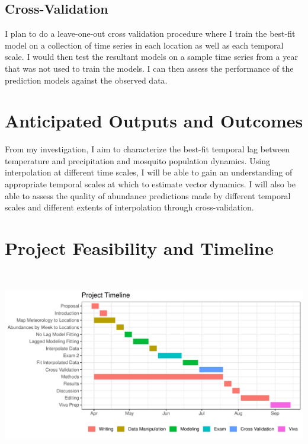 \documentclass[11pt, a4paper]{article}
\begin{document}

\subsection{Cross-Validation}  
I plan to do a leave-one-out cross validation procedure where I train the best-fit model on a collection of time series in each location as well as each temporal scale. I would then test the resultant models on a sample time series from a year that was not used to train the models. I can then assess the performance of the prediction models against the observed data. 

\section{Anticipated Outputs and Outcomes}
From my investigation, I aim to characterize the best-fit temporal lag between temperature and precipitation and mosquito population dynamics. Using interpolation at different time scales, I will be able to gain an understanding of appropriate temporal scales at which to estimate vector dynamics. I will also be able to assess the quality of abundance predictions made by different temporal scales and different extents of interpolation through cross-validation. 

\section{Project Feasibility and Timeline}

\includegraphics[height = 3.3in, width = 6.7in]{../Results/gantt.pdf}
\end{document}
